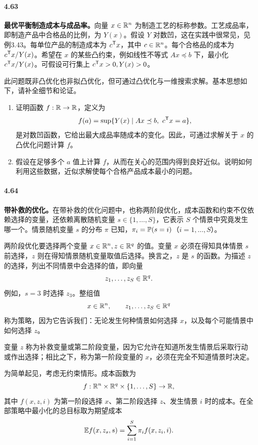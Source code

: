\paragraph{4.63}\textbf{最优平衡制造成本与成品率。}向量 $x\in\mathbb R^n$ 为制造工艺的标称参数。工艺成品率，即制造产品中合格品的比例，为 $Y(x)$。假设 $Y$ 对数凹，这在实践中很常见，见例3.43。每单位产品的制造成本为 $c^\mathsf T x$，其中 $c\in\mathbb R^n$。每个合格品的成本为 $c^\mathsf T x/Y(x)$。希望在 $x$ 的某些凸约束，例如线性不等式 $Ax\preceq b$ 下，最小化 $c^\mathsf T x/Y(x)$。可假设可行集上 $c^\mathsf T x>0,Y(x)>0$。

此问题既非凸优化也非拟凸优化，但可通过凸优化与一维搜索求解。基本思想如下，请补全细节和论证。
\begin{enumerate}[label=(\alph*)]
\item 证明函数 $f:\mathbb R\to\mathbb R$，定义为
\[
f(a)=\sup\{Y(x)\mid Ax\preceq b,\ c^\mathsf T x=a\},
\]
是对数凹函数，它给出最大成品率随成本的变化。因此，可通过求解关于 $x$ 的凸优化问题计算 $f$。
\item 假设在足够多个 $a$ 值上计算 $f$，从而在关心的范围内得到良好近似。说明如何利用这些数据，近似求解使每个合格产品成本最小的问题。
\end{enumerate}

\paragraph{4.64}\textbf{带补救的优化。}在带补救的优化问题中，也称两阶段优化，成本函数和约束不仅依赖选择的变量，还依赖离散随机变量 $s\in\{1,\ldots,S\}$，它表示 $S$ 个情景中究竟发生哪一个。情景随机变量 $s$ 的分布 $\pi$ 已知，$\pi_i=\mathbb P(s=i)$（$i=1,\ldots,S$）。

两阶段优化要选择两个变量 $x\in\mathbb R^n,z\in\mathbb R^q$ 的值。变量 $x$ 必须在得知具体情景 $s$ 前选择，$z$ 则在得知情景随机变量取值后选择。换言之，$z$ 是 $s$ 的函数。为描述 $z$ 的选择，列出不同情景中会选择的值，即向量
\[
z_1,\ldots,z_S\in\mathbb R^q.
\]
例如，$s=3$ 时选择 $z_3$。整组值
\[
x\in\mathbb R^n,\qquad z_1,\ldots,z_S\in\mathbb R^q
\]
称为策略，因为它告诉我们：无论发生何种情景如何选择 $x$，以及每个可能情景中如何选择 $z$。

变量 $z$ 称为补救变量或第二阶段变量，因为它允许在知道所发生情景后采取行动或作出选择；相比之下，称为第一阶段变量的 $x$，必须在完全不知道情景时决定。

为简单起见，考虑无约束情形。成本函数为
\[
f:\mathbb R^n\times\mathbb R^q\times\{1,\ldots,S\}\to\mathbb R,
\]
其中 $f(x,z,i)$ 为第一阶段选择 $x$、第二阶段选择 $z$、发生情景 $i$ 时的成本。在全部策略中最小化的总目标取为期望成本
\[
\mathbb E f(x,z_s,s)=\sum_{i=1}^S\pi_if(x,z_i,i).
\]

